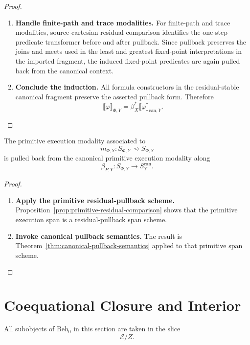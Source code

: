 \begin{proof}
\begin{enumerate}
  \item \textbf{Handle finite-path and trace modalities.}
  For finite-path and trace modalities, source-cartesian residual comparison
  identifies the one-step predicate transformer before and after pullback.
  Since pullback preserves the joins and meets used in the least and greatest
  fixed-point interpretations in the imported fragment, the induced
  fixed-point predicates are again pulled back from the canonical context.

  \item \textbf{Conclude the induction.}
  All formula constructors in the residual-stable canonical fragment preserve
  the asserted pullback form.  Therefore
  \[
    \llbracket\varphi\rrbracket_{\Phi,Y}
    =
    \beta_X^*
    \llbracket\varphi\rrbracket_{\mathrm{can},Y}.
  \]
\end{enumerate}
\end{proof}

\begin{corollary}
\label{cor:primitive-canonical-pullback-semantics}
The primitive execution modality associated to
\[
  m_{\Phi,Y}:S_{\Phi,Y}\rightsquigarrow S_{\Phi,Y}
\]
is pulled back from the canonical primitive execution modality along
\[
  \beta_{P,Y}:S_{\Phi,Y}\to S^{\mathrm{can}}_Y.
\]
\end{corollary}

\begin{proof}
\leavevmode
\begin{enumerate}
  \item \textbf{Apply the primitive residual-pullback scheme.}
  Proposition~\ref{prop:primitive-residual-comparison} shows that the
  primitive execution span is a residual-pullback span scheme.

  \item \textbf{Invoke canonical pullback semantics.}
  The result is Theorem~\ref{thm:canonical-pullback-semantics} applied to
  that primitive span scheme.
\end{enumerate}
\end{proof}

\section{Coequational Closure and Interior}
\label{sec:coequational-closure-and-interior}

All subobjects of \(\mathrm{Beh}_0\) in this section are taken in the slice
\[
  \mathcal E/Z.
\]

